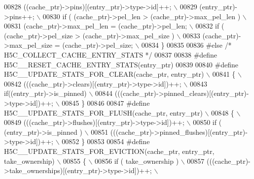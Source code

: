 \begin{DoxyCode}
00828 \textcolor{preprocessor}{    ((cache\_ptr)->pins)[(entry\_ptr)->type->id]++;            \(\backslash\)}
00829 \textcolor{preprocessor}{    (entry\_ptr)->pins++;                                     \(\backslash\)}
00830 \textcolor{preprocessor}{    if ( (cache\_ptr)->pel\_len > (cache\_ptr)->max\_pel\_len )   \(\backslash\)}
00831 \textcolor{preprocessor}{        (cache\_ptr)->max\_pel\_len = (cache\_ptr)->pel\_len;     \(\backslash\)}
00832 \textcolor{preprocessor}{    if ( (cache\_ptr)->pel\_size > (cache\_ptr)->max\_pel\_size ) \(\backslash\)}
00833 \textcolor{preprocessor}{        (cache\_ptr)->max\_pel\_size = (cache\_ptr)->pel\_size;   \(\backslash\)}
00834 \textcolor{preprocessor}{\}}
00835 
00836 \textcolor{preprocessor}{#else }\textcolor{comment}{/* H5C\_COLLECT\_CACHE\_ENTRY\_STATS */}\textcolor{preprocessor}{}
00837 
00838 \textcolor{preprocessor}{#define H5C\_\_RESET\_CACHE\_ENTRY\_STATS(entry\_ptr)}
00839 
00840 \textcolor{preprocessor}{#define H5C\_\_UPDATE\_STATS\_FOR\_CLEAR(cache\_ptr, entry\_ptr)         \(\backslash\)}
00841 \textcolor{preprocessor}{\{                                                                 \(\backslash\)}
00842 \textcolor{preprocessor}{    (((cache\_ptr)->clears)[(entry\_ptr)->type->id])++;             \(\backslash\)}
00843 \textcolor{preprocessor}{    if((entry\_ptr)->is\_pinned)                                    \(\backslash\)}
00844 \textcolor{preprocessor}{        (((cache\_ptr)->pinned\_clears)[(entry\_ptr)->type->id])++;  \(\backslash\)}
00845 \textcolor{preprocessor}{\}}
00846 
00847 \textcolor{preprocessor}{#define H5C\_\_UPDATE\_STATS\_FOR\_FLUSH(cache\_ptr, entry\_ptr)         \(\backslash\)}
00848 \textcolor{preprocessor}{\{                                                                 \(\backslash\)}
00849 \textcolor{preprocessor}{    (((cache\_ptr)->flushes)[(entry\_ptr)->type->id])++;            \(\backslash\)}
00850 \textcolor{preprocessor}{    if ( (entry\_ptr)->is\_pinned )                                 \(\backslash\)}
00851 \textcolor{preprocessor}{        (((cache\_ptr)->pinned\_flushes)[(entry\_ptr)->type->id])++; \(\backslash\)}
00852 \textcolor{preprocessor}{\}}
00853 
00854 \textcolor{preprocessor}{#define H5C\_\_UPDATE\_STATS\_FOR\_EVICTION(cache\_ptr, entry\_ptr, take\_ownership) \(\backslash\)}
00855 \textcolor{preprocessor}{\{                                                                            \(\backslash\)}
00856 \textcolor{preprocessor}{    if ( take\_ownership )                                                    \(\backslash\)}
00857 \textcolor{preprocessor}{        (((cache\_ptr)->take\_ownerships)[(entry\_ptr)->type->id])++;           \(\backslash\)}

\end{DoxyCode}

